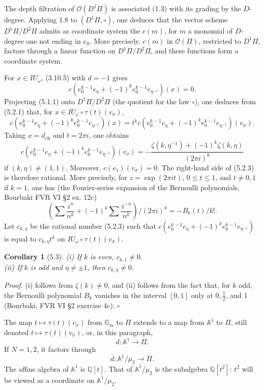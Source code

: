 \documentclass[10pt,a4paper]{article}
\newcommand{\Gm}{\mathbb G_m}
\newcommand{\Q}{\mathbb Q}
\newcommand{\A}{\mathbb A}
\newcommand{\OO}{\mathcal O}
\theoremstyle{deligne}
\newtheorem*{corollary*}{Corollary}
\newenvironment{proofdel}{\textit{Proof.}}{\hfill$\square$}
\newcommand{\heading}[1]{\vspace{0.65em}\noindent{\bfseries #1}\quad}
\begin{document}
The depth filtration of \(\OO(D^1\Pi)\) is associated (1.3) with its grading by the \(D\)-degree. Applying 1.8 to \((D^1\Pi,\circ)\), one deduces that the vector scheme \(D^1\Pi/D^2\Pi\) admits as coordinate system the \(c(m)\), for \(m\) a monomial of \(D\)-degree one not ending in \(e_0\). More precisely, \(c(m)\) in \(\OO(\Pi)\), restricted to \(D^1\Pi\), factors through a linear function on \(D^1\Pi/D^2\Pi\), and these functions form a coordinate system.

For \(x\in IU_\omega\), (3.10.5) with \(d=-1\) gives
\[
\tag{5.2.1}
c(e_0^{k-1}e_\eta+(-1)^ke_0^{k-1}e_{\eta^{-1}})(x)=0.
\]
Projecting (5.1.1) onto \(D^1\Pi/D^2\Pi\) (the quotient for the law \(\circ\)), one deduces from (5.2.1) that, for \(x\in IU_\omega\circ\tau(t)(v_\sigma)\),
\[
\tag{5.2.2}
c(e_0^{k-1}e_\eta+(-1)^ke_0^{k-1}e_{\eta^{-1}})(x)
=t^k c(e_0^{k-1}e_\eta+(-1)^ke_0^{k-1}e_{\eta^{-1}})(v_\sigma).
\]
Taking \(x=d_{\mathrm{ch}}\) and \(t=2\pi i\), one obtains
\[
\tag{5.2.3}
c(e_0^{k-1}e_\eta+(-1)^ke_0^{k-1}e_{\eta^{-1}})(v_\sigma)
=-\frac{\zeta(k,\eta^{-1})+(-1)^k\zeta(k,\eta)}{(2\pi i)^k}
\]
if \((k,\eta)\ne(1,1)\). Moreover, \(c(e_1)(v_\sigma)=0\). The right-hand side of (5.2.3) is therefore rational. More precisely, for \(z=\exp(2\pi it)\), \(0\le t\le1\), and \(t\ne0,1\) if \(k=1\), one has (the Fourier-series expansion of the Bernoulli polynomials, Bourbaki FVR VI \S2 ex. 12c)
\[
\tag{5.2.4}
\left(\sum\frac{z^n}{n^k}+(-1)^k\sum\frac{z^{-n}}{n^k}\right)/(2\pi i)^k=-B_k(t)/k!.
\]
Let \(c_{k,\eta}\) be the rational number (5.2.3) such that \(c(e_0^{k-1}e_\eta+(-1)^ke_0^{k-1}e_{\eta^{-1}})\) is equal to \(c_{k,\eta}t^k\) on \(IU_\omega\circ\tau(t)(v_\sigma)\).

\begin{corollary*}[5.3]
(i) If \(k\) is even, \(c_{k,1}\ne0\).\\
(ii) If \(k\) is odd and \(\eta\ne\pm1\), then \(c_{k,\eta}\ne0\).
\end{corollary*}

\begin{proofdel}
(i) follows from \(\zeta(k)\ne0\), and (ii) follows from the fact that, for \(k\) odd, the Bernoulli polynomial \(B_k\) vanishes in the interval \([0,1]\) only at \(0,\frac12\), and \(1\) (Bourbaki, FVR VI \S2 exercise 4c).
\end{proofdel}

\heading{5.4.} The map \(t\mapsto\tau(t)(v_\sigma)\) from \(\Gm\) to \(\Pi\) extends to a map from \(\A^1\) to \(\Pi\), still denoted \(t\mapsto\tau(t)(v_\sigma)\), or, in this paragraph,
\[
\tag{5.4.1}
d:\A^1\longrightarrow\Pi.
\]
If \(N=1,2\), it factors through
\[
\tag{5.4.2}
\bar d:\A^1/\mu_2\longrightarrow\Pi.
\]
The affine algebra of \(\A^1\) is \(\Q[t]\). That of \(\A^1/\mu_2\) is the subalgebra \(\Q[t^2]\): \(t^2\) will be viewed as a coordinate on \(\A^1/\mu_2\).
\end{document}
